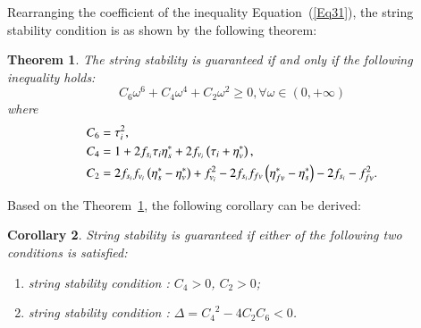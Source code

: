 \documentclass[journal]{IEEEtran}
\newtheorem{theorem}{Theorem}
\newtheorem{corollary}[theorem]{Corollary}
\begin{document}
Rearranging the coefficient of the inequality Equation~(\ref{Eq31}), the string stability condition is as shown by the following theorem:
\begin{theorem}
  \label{theorem1}
  The string stability is guaranteed if and only if the following inequality holds:
  \begin{equation}
    C_{6} \omega^{6}+C_{4} \omega^{4}+C_{2} \omega^{2} \geq 0, \forall \omega \in(0,+\infty)
    \label{Eq32}
  \end{equation}
  where
  \begin{equation*}
    \begin{gathered}
      C_{6}=\tau_{i}^{2}, \hfill \\
      C_{4}=1+2 f_{s_{i}} \tau_{i} \eta_{s}^{*}+2 f_{v_{i}}\left(\tau_{i}+\eta_{v}^{*}\right), \hfill \\
      C_{2}=2 f_{s_{i}} f_{v_{i}}\left(\eta_{s}^{*}-\eta_{v}^{*}\right)+f_{v_{i}}^{2}-2 f_{s_{i}} f_{f v}\left(\eta_{f v}^{*}-\eta_{s}^{*}\right)-2 f_{s_{i}}-f_{f v}^{2}. \hfill \\
    \end{gathered}
  \end{equation*}
\end{theorem}

Based on the Theorem~\ref{theorem1}, the following corollary can be derived:
\begin{corollary}
String stability is guaranteed if either of the following two conditions is satisfied:
  \begin{enumerate}
    \item string stability condition \uppercase\expandafter{}: $C_4>0$, $C_2>0$;
    \item string stability condition \uppercase\expandafter{}: $\Delta={C_4}^2-4C_2C_6<0$.
  \end{enumerate}
\end{corollary}
\end{document}
